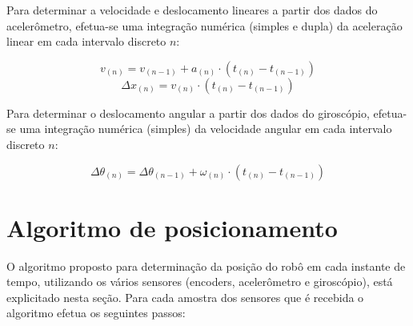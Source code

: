 Para determinar a velocidade e deslocamento lineares a partir dos dados do acelerômetro, efetua-se uma integração numérica (simples e dupla) da aceleração linear em cada intervalo discreto $n$:

\begin{equation}
  v_{(n)} = v_{(n - 1)} + a_{(n)} \cdot (t_{(n)} - t_{(n-1)})
  \label{eq:v_acelerometro}
\end{equation}
\begin{equation}
  \Delta x_{(n)} = v_{(n)} \cdot (t_{(n)} - t_{(n-1)})
  \label{eq:x_acelerometro}
\end{equation}

Para determinar o deslocamento angular a partir dos dados do giroscópio, efetua-se uma integração numérica (simples) da velocidade angular em cada intervalo discreto $n$:

\begin{equation}
  \Delta \theta_{(n)} = \Delta \theta_{(n - 1)} + \omega_{(n)} \cdot (t_{(n)} - t_{(n-1)})
  \label{eq:theta_giroscopio}
\end{equation}


\section{Algoritmo de posicionamento}

O algoritmo proposto para determinação da posição do robô em cada instante de tempo, utilizando os vários sensores (encoders, acelerômetro e giroscópio), está explicitado nesta seção. Para cada amostra dos sensores que é recebida o algoritmo efetua os seguintes passos:

